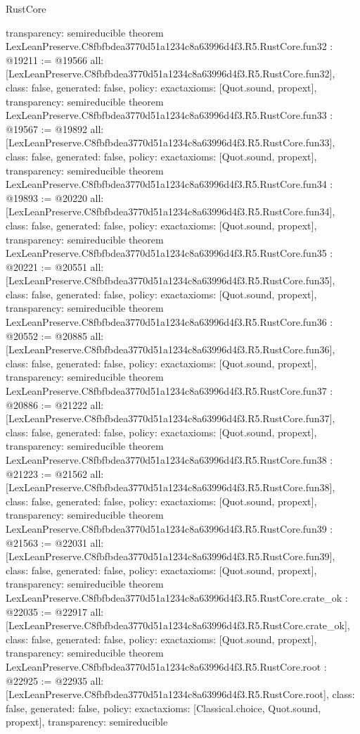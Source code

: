 \begin{lexlean}{RustCore}
\begin{coremodule}
{  transparency: semireducible
}
theorem LexLeanPreserve.C8fbfbdea3770d51a1234c8a63996d4f3.R5.RustCore.fun32 : @19211 := @19566 {
  all: [LexLeanPreserve.C8fbfbdea3770d51a1234c8a63996d4f3.R5.RustCore.fun32],
  class: false,
  generated: false,
  policy: exact{axioms: [Quot.sound, propext]},
  transparency: semireducible
}
theorem LexLeanPreserve.C8fbfbdea3770d51a1234c8a63996d4f3.R5.RustCore.fun33 : @19567 := @19892 {
  all: [LexLeanPreserve.C8fbfbdea3770d51a1234c8a63996d4f3.R5.RustCore.fun33],
  class: false,
  generated: false,
  policy: exact{axioms: [Quot.sound, propext]},
  transparency: semireducible
}
theorem LexLeanPreserve.C8fbfbdea3770d51a1234c8a63996d4f3.R5.RustCore.fun34 : @19893 := @20220 {
  all: [LexLeanPreserve.C8fbfbdea3770d51a1234c8a63996d4f3.R5.RustCore.fun34],
  class: false,
  generated: false,
  policy: exact{axioms: [Quot.sound, propext]},
  transparency: semireducible
}
theorem LexLeanPreserve.C8fbfbdea3770d51a1234c8a63996d4f3.R5.RustCore.fun35 : @20221 := @20551 {
  all: [LexLeanPreserve.C8fbfbdea3770d51a1234c8a63996d4f3.R5.RustCore.fun35],
  class: false,
  generated: false,
  policy: exact{axioms: [Quot.sound, propext]},
  transparency: semireducible
}
theorem LexLeanPreserve.C8fbfbdea3770d51a1234c8a63996d4f3.R5.RustCore.fun36 : @20552 := @20885 {
  all: [LexLeanPreserve.C8fbfbdea3770d51a1234c8a63996d4f3.R5.RustCore.fun36],
  class: false,
  generated: false,
  policy: exact{axioms: [Quot.sound, propext]},
  transparency: semireducible
}
theorem LexLeanPreserve.C8fbfbdea3770d51a1234c8a63996d4f3.R5.RustCore.fun37 : @20886 := @21222 {
  all: [LexLeanPreserve.C8fbfbdea3770d51a1234c8a63996d4f3.R5.RustCore.fun37],
  class: false,
  generated: false,
  policy: exact{axioms: [Quot.sound, propext]},
  transparency: semireducible
}
theorem LexLeanPreserve.C8fbfbdea3770d51a1234c8a63996d4f3.R5.RustCore.fun38 : @21223 := @21562 {
  all: [LexLeanPreserve.C8fbfbdea3770d51a1234c8a63996d4f3.R5.RustCore.fun38],
  class: false,
  generated: false,
  policy: exact{axioms: [Quot.sound, propext]},
  transparency: semireducible
}
theorem LexLeanPreserve.C8fbfbdea3770d51a1234c8a63996d4f3.R5.RustCore.fun39 : @21563 := @22031 {
  all: [LexLeanPreserve.C8fbfbdea3770d51a1234c8a63996d4f3.R5.RustCore.fun39],
  class: false,
  generated: false,
  policy: exact{axioms: [Quot.sound, propext]},
  transparency: semireducible
}
theorem LexLeanPreserve.C8fbfbdea3770d51a1234c8a63996d4f3.R5.RustCore.crate_ok : @22035 := @22917 {
  all: [LexLeanPreserve.C8fbfbdea3770d51a1234c8a63996d4f3.R5.RustCore.crate_ok],
  class: false,
  generated: false,
  policy: exact{axioms: [Quot.sound, propext]},
  transparency: semireducible
}
theorem LexLeanPreserve.C8fbfbdea3770d51a1234c8a63996d4f3.R5.RustCore.root : @22925 := @22935 {
  all: [LexLeanPreserve.C8fbfbdea3770d51a1234c8a63996d4f3.R5.RustCore.root],
  class: false,
  generated: false,
  policy: exact{axioms: [Classical.choice, Quot.sound, propext]},
  transparency: semireducible
}


\end{coremodule}
\end{lexlean}
